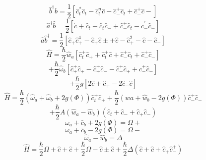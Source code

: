 \begin{equation}
    \hat{b}^{\dagger} \hat{b}=\frac{1}{2}\left[\hat{c}_{t}^{*} \hat{c}_{t}-\hat{c}_{t}^{n} \hat{c}-\hat{c}_{-}^{+} \hat{c}_{t}+\hat{c}_{-}^{+} \hat{c}-\right]
\end{equation}
\begin{equation}
    \hat{a}^{\dagger} \hat{b}=\frac{1}{2}\left[\dot{c}+\hat{c}_{t}-\hat{c}_{t} \hat{c}_{-}+\hat{c}_{-}^{+} \hat{c}_{t}-\hat{c}_{-}^{\prime} \hat{c}_{-}\right]
\end{equation}
\begin{equation}
    \hat{a} \hat{b}^{\dagger}=\frac{1}{2}\left[\hat{c}_{+} \hat{c}_{+}^{4}-\hat{c}_{+} \hat{c} \pm+\hat{c}-\hat{c}_{+}^{2}-\hat{c}-\hat{c}_{-}\right]
\end{equation}
\begin{equation}
    \hat{H}=\frac{\hbar}{2} \hat{w}_{a}\left[\hat{c}_{t}^{+} \hat{c}_{+}+\hat{c}_{t}^{+} \hat{c}+\hat{c}_{-}^{+} \hat{c}_{t}+\hat{c}_{-}^{+} \hat{c}_{-}\right]
\end{equation}
\begin{equation}
    +\frac{\hbar}{2} \hat{\omega}_{b}\left[\hat{c}_{+}^{+} \hat{c}_{+}-\hat{c}_{+}^{+} \hat{c}_{-}-\hat{c}_{-}^{+} \hat{c}_{+}+\hat{c}_{-}^{+} \hat{c}_{-}\right]
\end{equation}
\begin{equation}
    +\frac{\hbar}{2} g\left[2 \hat{c}+\hat{c}_{+}-2 \hat{c}_{-} \hat{c}\right]
\end{equation}
\begin{equation}
    \hat{H}=\frac{\hbar}{2}\left(\hat{\omega}_{a}+\hat{\omega}_{b}+2 g(\Phi)\right) \hat{c}_{t}^{+} \hat{c}_{+}+\frac{\hbar}{2}\left(\hat{w} a+\hat{w}_{b}-2 g(\Phi)\right) \hat{c}_{-}^{+} \hat{c}_{-}
\end{equation}
\begin{equation}
    +\frac{\hbar}{2} A\left(\hat{w}_{a}-\hat{w}_{b}\right)\left(\hat{c}_{t}+\hat{c}_{-}+\hat{c}_{+} \hat{c}_{-}\right)
\end{equation}
\begin{equation}
    \omega_{a}+\bar{c}_{b}+2 g(\Phi)=\Omega+
\end{equation}
\begin{equation}
    \omega_{a}+\bar{c}_{b}-2 g(\Phi)=\Omega-
\end{equation}
\begin{equation}
    \hat{\omega}_{a}-\hat{w}_{b}=\Delta
\end{equation}
\begin{equation}
    \hat{H}=\frac{\hbar}{2} \Omega+\hat{c}+\hat{c}+\frac{\hbar}{2} \Omega-\hat{c} \pm \hat{c}+\frac{\hbar}{2} \Delta\left(\hat{c}+\hat{c}+\hat{c}_{+} \hat{c}_{-}^{+}\right)
\end{equation}
